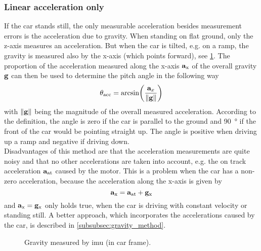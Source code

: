 \subsubsection{Linear acceleration only}
\label{ssec:linear_acceleration_only}
If the car stands still, the only measurable acceleration besides measurement errors is the acceleration due to gravity.
When standing on flat ground, only the z-axis measures an acceleration.
But when the car is tilted, e.g. on a ramp, the gravity is measured also by the x-axis (which points forward), see \cref{fig:tikz_car_gravity}.
The proportion of the acceleration measured along the x-axis $\vb{a}_\mathrm{x} $ of the overall gravity $\vb{g}$ can then be used to determine the pitch angle in the following way
\begin{equation}
	\label{eq:ang_from_acc}
	\theta_\mathrm{acc}  = \arcsin(\frac{\vb{a}_x}{\norm{\vb{g}}})
\end{equation}
with $\norm{\vb{g}}$ being the magnitude of the overall measured acceleration.
According to the definition, the angle is zero if the car is parallel to the ground and \SI{90}{\degree} if the front of the car would be pointing straight up.
The angle is positive when driving up a ramp and negative if driving down.\\
Disadvantages of this method are that the acceleration measurements are quite noisy and that no other accelerations are taken into account, e.g. the on track acceleration $\vb{a}_\mathrm{at}$ caused by the motor.
This is a problem when the car has a non-zero acceleration, because the acceleration along the x-axis is given by
\begin{equation}
	\vb{a}_\mathrm{x} = \vb{a}_\mathrm{at} + \vb{g}_\mathrm{x}
\end{equation}
and $\vb{a}_\mathrm{x} = \vb{g}_\mathrm{x} $ only holds true, when the car is driving with constant velocity or standing still.
A better approach, which incorporates the accelerations caused by the car, is described in \cref{subsubsec:gravity_method}.
\begin{figure}[htpb]
	\centering
	
	\caption{Gravity measured by \acrshort{imu} (in car frame).}
	\label{fig:tikz_car_gravity}
\end{figure}

